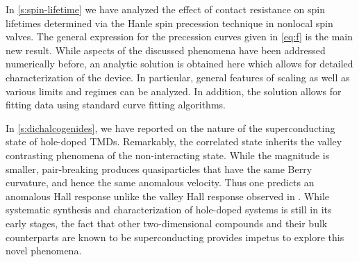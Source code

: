 In \cref{s:spin-lifetime} we have analyzed the effect of contact resistance
on spin lifetimes determined via the Hanle spin precession technique
in nonlocal spin valves.
The general expression for the precession curves given
in \cref{eq:f} is the main new result.
While aspects of the discussed phenomena have been addressed numerically before,
an analytic solution is obtained here
which allows for detailed characterization of the device.
In particular, general features of scaling
as well as various limits and regimes can be analyzed.
In addition, the solution allows for fitting data
using standard curve fitting algorithms.

In \cref{s:dichalcogenides}, we have reported on the
nature of the superconducting state of hole-doped TMDs.
Remarkably, the correlated state inherits
the valley contrasting phenomena of the non-interacting state.
While the magnitude is smaller, pair-breaking produces quasiparticles
that have the same Berry curvature, and hence the same anomalous velocity.
Thus one predicts an anomalous Hall response unlike the valley Hall response
observed in .
While systematic synthesis and characterization of hole-doped systems
is still in its early stages, the fact that other two-dimensional compounds
and their bulk counterparts are known to be superconducting
\cite{PhysRevB.88.054515}
provides impetus to explore this novel phenomena.
